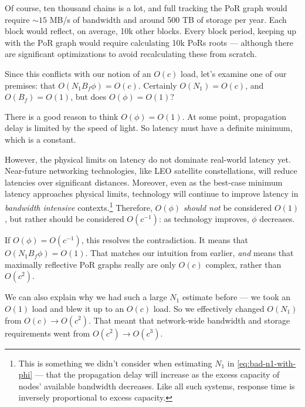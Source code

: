 Of course, ten thousand chains is a lot, and full tracking the PoR graph would require $\sim 15$ MB/s of bandwidth and around 500 TB of storage per year.
Each block would reflect, on average, 10k other blocks.
Every block period, keeping up with the PoR graph would require calculating 10k PoRs roots --- although there are significant optimizations to avoid recalculating these from scratch.


Since this conflicts with our notion of an $O(c)$ load, let's examine one of our premises: that $O(N_1 B_f \phi) = O(c)$.
Certainly $O(N_1) = O(c)$, and $O(B_f) = O(1)$, but does $O(\phi) = O(1)$?

There is a good reason to think $O(\phi) = O(1)$.
At some point, propagation delay is limited by the speed of light.
So latency must have a definite minimum, which is a constant.

However, the physical limits on latency do not dominate real-world latency yet.
Near-future networking technologies, like LEO satellite constellations, will reduce latencies over significant distances.
Moreover, even as the best-case minimum latency approaches physical limits, technology will continue to improve latency in \emph{bandwidth intensive} contexts.\footnote{
    This is something we didn't consider when estimating $N_1$ in \autoref{eq:bad-n1-with-phi} --- that the propagation delay will increase as the excess capacity of nodes' available bandwidth decreases.
    Like all such systems, response time is inversely proportional to excess capacity.
}
Therefore, $O(\phi)$ \emph{should not} be considered $O(1)$, but rather should be considered $O(c^{-1})$: as technology improves, $\phi$ decreases.

If $O(\phi) = O(c^{-1})$, this resolves the contradiction.
It means that $O(N_1 B_f \phi) = O(1)$.
That matches our intuition from earlier, \emph{and} means that maximally reflective PoR graphs really are only $O(c)$ complex, rather than $O(c^2)$.

We can also explain why we had such a large $N_1$ estimate before --- we took an $O(1)$ load and blew it up to an $O(c)$ load.
So we effectively changed $O(N_1)$ from $O(c) \to O(c^2)$.
That meant that network-wide bandwidth and storage requirements went from $O(c^2) \to O(c^3)$.

